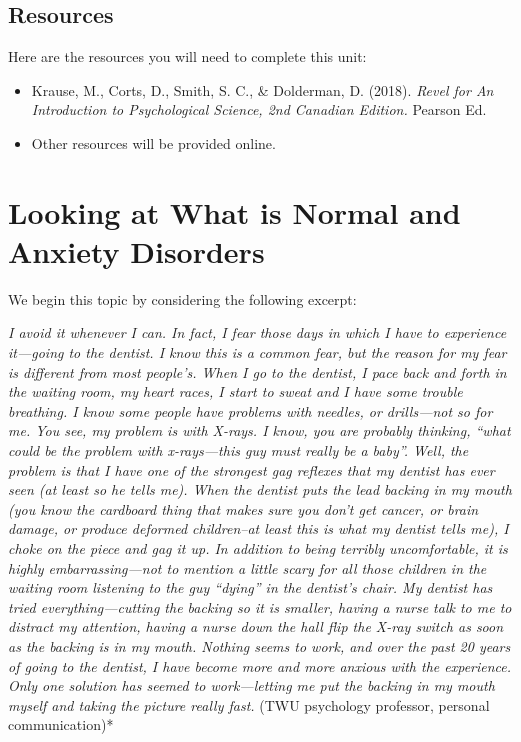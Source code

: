 \documentclass[
]{book}
\providecommand{\tightlist}{%
  \setlength{\itemsep}{0pt}\setlength{\parskip}{0pt}}
\begin{document}
\hypertarget{resources-11}{%
\subsection*{Resources}\label{resources-11}}

Here are the resources you will need to complete this unit:

\begin{itemize}
\tightlist
\item
  Krause, M., Corts, D., Smith, S. C., \& Dolderman, D. (2018). \emph{Revel for An Introduction to Psychological Science, 2nd Canadian Edition.} Pearson Ed.\\
\item
  Other resources will be provided online.
\end{itemize}

\hypertarget{looking-at-what-is-normal-and-anxiety-disorders}{%
\section{Looking at What is Normal and Anxiety Disorders}\label{looking-at-what-is-normal-and-anxiety-disorders}}

We begin this topic by considering the following excerpt:

\emph{I avoid it whenever I can. In fact, I fear those days in which I have to experience it---going to the dentist. I know this is a common fear, but the reason for my fear is different from most people's. When I go to the dentist, I pace back and forth in the waiting room, my heart races, I start to sweat and I have some trouble breathing. I know some people have problems with needles, or drills---not so for me. You see, my problem is with X-rays. I know, you are probably thinking, ``what could be the problem with x-rays---this guy must really be a baby''. Well, the problem is that I have one of the strongest gag reflexes that my dentist has ever seen (at least so he tells me). When the dentist puts the lead backing in my mouth (you know the cardboard thing that makes sure you don't get cancer, or brain damage, or produce deformed children--at least this is what my dentist tells me), I choke on the piece and gag it up. In addition to being terribly uncomfortable, it is highly embarrassing---not to mention a little scary for all those children in the waiting room listening to the guy ``dying'' in the dentist's chair. My dentist has tried everything---cutting the backing so it is smaller, having a nurse talk to me to distract my attention, having a nurse down the hall flip the X-ray switch as soon as the backing is in my mouth. Nothing seems to work, and over the past 20 years of going to the dentist, I have become more and more anxious with the experience. Only one solution has seemed to work---letting me put the backing in my mouth myself and taking the picture really fast.} (TWU psychology professor, personal communication)*
\end{document}
